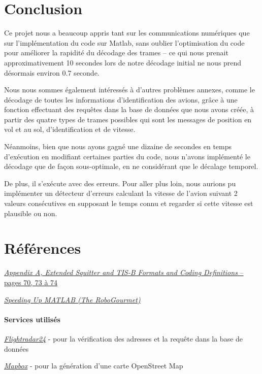 \documentclass[a4paper, 10pt]{article}
\begin{document}
\newpage
\part*{Conclusion}
 
Ce projet nous a beaucoup appris tant sur les communications numériques que sur l'implémentation du code sur Matlab, sans oublier l'optimisation du code pour améliorer la rapidité du décodage des trames -- ce qui nous prenait approximativement 10 secondes lors de notre décodage initial ne nous prend désormais environ 0.7 seconde.

\vspace{10pt}
Nous nous sommes également intéressés à d'autres problèmes annexes, comme le décodage de toutes les informations d'identification des avions, grâce à une fonction effectuant des requêtes dans la base de données que nous avons créée, à partir des quatre types de trames possibles qui sont les messages de position en vol et au sol, d'identification et de vitesse.

\vspace{10pt}
Néanmoins, bien que nous ayons gagné une dizaine de secondes en temps d'exécution en modifiant certaines parties du code, nous n'avons implémenté le décodage que de façon sous-optimale, en ne considérant que le décalage temporel.

De plus, il s'exécute avec des erreurs. Pour aller plus loin, nous aurions pu implémenter un détecteur d'erreurs calculant la vitesse de l'avion suivant 2 valeurs consécutives en supposant le temps connu et regarder si cette vitesse est plausible ou non.



\part*{Références}
 
\noindent
[1] \href{http://adsb.tc.faa.gov/WG3_Meetings/Meeting30/1090-WP30-21-Appendix_A\%20Mods.pdf}{ \textit{Appendix A, Extended Squitter and TIS-B Formats and Coding Definitions} -- pages 70, 73 à 74}

\noindent
[2] \href{http://www.robogourmet.com/?p=208}{\textit{Speeding Up MATLAB (The RoboGourmet)}}

\subsection*{Services utilisés}
\noindent
\href{http://flightradar24.com}{\textit{Flightradar24}} - pour la vérification des adresses et la requête dans la base de données

\noindent
\href{http://mapbox.com}{\textit{Mapbox}} - pour la génération d'une carte OpenStreet Map
    
\end{document}

